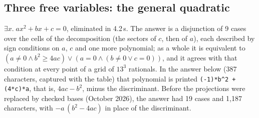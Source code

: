 \documentclass[11pt]{article}
\begin{document}
\subsection{Three free variables: the general quadratic}
$\exists x.\; a x^2 + b x + c = 0$, eliminated in 4.2\,s. The answer is a disjunction of 9 cases over the cells
of the decomposition (the sectors of $c$, then of $a$), each described by sign conditions on $a$, $c$ and one more
polynomial; as a whole it is equivalent to $(a \ne 0 \land b^2 \ge 4ac) \lor (a = 0 \land (b \ne 0 \lor c = 0))$,
and it agrees with that condition at every point of a grid of $13^3$ rationals. In the answer below (387
characters, captured with the table) that polynomial is printed \texttt{(-1)*b\^{}2 + (4*c)*a}, that is,
$4ac - b^2$, minus the discriminant. Before the projections were replaced by checked bases (October 2026), the
answer had 19 cases and 1,187 characters, with $-a\,(b^2 - 4ac)$ in place of the discriminant.
\begin{termbox}
\end{termbox}
\end{document}
